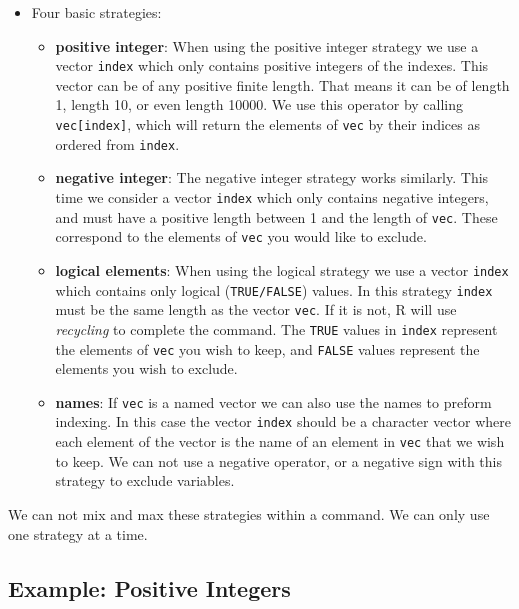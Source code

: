 \documentclass[
]{book}
\providecommand{\tightlist}{%
  \setlength{\itemsep}{0pt}\setlength{\parskip}{0pt}}
\begin{document}
\begin{itemize}
\tightlist
\item
  Four basic strategies:

  \begin{itemize}
  \tightlist
  \item
    \textbf{positive integer}: When using the positive integer strategy we use a vector \texttt{index} which only contains positive integers of the indexes. This vector can be of any positive finite length. That means it can be of length 1, length 10, or even length 10000. We use this operator by calling \texttt{vec{[}index{]}}, which will return the elements of \texttt{vec} by their indices as ordered from \texttt{index}.
  \item
    \textbf{negative integer}: The negative integer strategy works similarly. This time we consider a vector \texttt{index} which only contains negative integers, and must have a positive length between 1 and the length of \texttt{vec}. These correspond to the elements of \texttt{vec} you would like to exclude.\\
  \item
    \textbf{logical elements}: When using the logical strategy we use a vector \texttt{index} which contains only logical (\texttt{TRUE/FALSE}) values. In this strategy \texttt{index} must be the same length as the vector \texttt{vec}. If it is not, R will use \emph{recycling} to complete the command. The \texttt{TRUE} values in \texttt{index} represent the elements of \texttt{vec} you wish to keep, and \texttt{FALSE} values represent the elements you wish to exclude.
  \item
    \textbf{names}: If \texttt{vec} is a named vector we can also use the names to preform indexing. In this case the vector \texttt{index} should be a character vector where each element of the vector is the name of an element in \texttt{vec} that we wish to keep. We can not use a negative operator, or a negative sign with this strategy to exclude variables.
  \end{itemize}
\end{itemize}

We can not mix and max these strategies within a command. We can only use one strategy at a time.

\hypertarget{example-positive-integers}{%
\subsection*{Example: Positive Integers}\label{example-positive-integers}}
\end{document}

